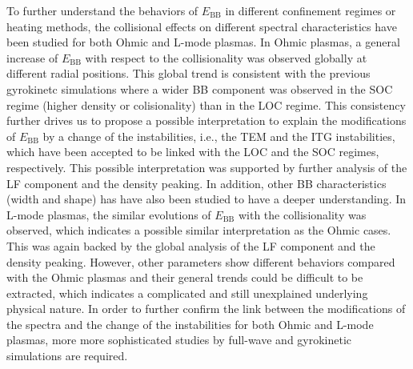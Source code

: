 To further understand the behaviors of $E_\mathrm{BB}$ in different confinement regimes or heating methods, the collisional effects on different spectral characteristics have been studied for both Ohmic and L-mode plasmas. In Ohmic plasmas, a general increase of $E_\mathrm{BB}$ with respect to the collisionality was observed globally at different radial positions. This global trend is consistent with the previous gyrokinetc simulations where a wider BB component was observed in the SOC regime (higher density or colisionality) than in the LOC regime. This consistency further drives us to propose a possible interpretation to explain the modifications of $E_\mathrm{BB}$ by a change of the instabilities, i.e., the TEM and the ITG instabilities, which have been accepted to be linked with the LOC and the SOC regimes, respectively. This possible interpretation was supported by further analysis of the LF component and the density peaking. In addition, other BB characteristics (width and shape) has have also been studied to have a deeper understanding. In L-mode plasmas, the similar evolutions of $E_\mathrm{BB}$ with the collisionality was observed, which indicates a possible similar interpretation as the Ohmic cases. This was again backed by the global analysis of the LF component and the density peaking. However, other parameters show different behaviors compared with the Ohmic plasmas and their general trends could be difficult to be extracted, which indicates a complicated and still unexplained underlying physical nature. In order to further confirm the link between the modifications of the spectra and the change of the instabilities for both Ohmic and L-mode plasmas, more more sophisticated studies by full-wave and gyrokinetic simulations are required.
